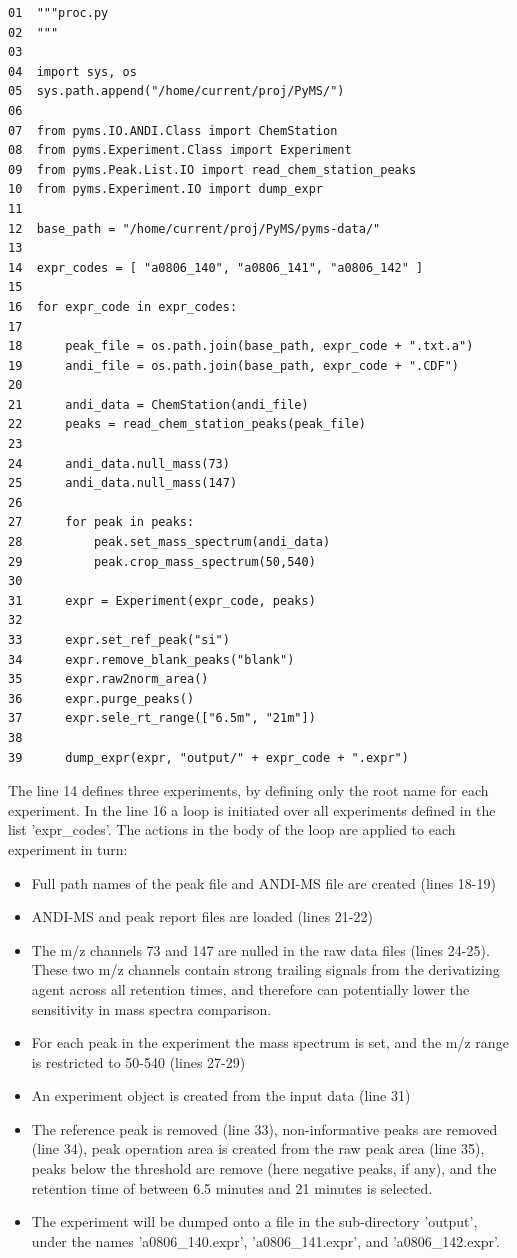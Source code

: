 \begin{verbatim}
01  """proc.py
02  """
03  
04  import sys, os
05  sys.path.append("/home/current/proj/PyMS/")
06  
07  from pyms.IO.ANDI.Class import ChemStation
08  from pyms.Experiment.Class import Experiment
09  from pyms.Peak.List.IO import read_chem_station_peaks
10  from pyms.Experiment.IO import dump_expr
11  
12  base_path = "/home/current/proj/PyMS/pyms-data/"
13  
14  expr_codes = [ "a0806_140", "a0806_141", "a0806_142" ]
15  
16  for expr_code in expr_codes:
17  
18      peak_file = os.path.join(base_path, expr_code + ".txt.a")
19      andi_file = os.path.join(base_path, expr_code + ".CDF")
20  
21      andi_data = ChemStation(andi_file)
22      peaks = read_chem_station_peaks(peak_file)
23  
24      andi_data.null_mass(73)
25      andi_data.null_mass(147)
26  
27      for peak in peaks:
28          peak.set_mass_spectrum(andi_data)
29          peak.crop_mass_spectrum(50,540)
30  
31      expr = Experiment(expr_code, peaks)
32  
33      expr.set_ref_peak("si")
34      expr.remove_blank_peaks("blank")
35      expr.raw2norm_area()
36      expr.purge_peaks()
37      expr.sele_rt_range(["6.5m", "21m"])
38  
39      dump_expr(expr, "output/" + expr_code + ".expr")
\end{verbatim}

\noindent
The line 14 defines three experiments, by defining only the root name for
each experiment. In the line 16 a loop is initiated over all experiments
defined in the list 'expr\_codes'.  The actions in the body of the loop
are applied to each experiment in turn:

\begin{itemize}
\item Full path names of the peak file and ANDI-MS file are created (lines 18-19)
\item ANDI-MS and peak report files are loaded (lines 21-22) 
\item The m/z channels 73 and 147 are nulled in the raw data files (lines
24-25). These two m/z channels contain strong trailing signals from the
derivatizing agent across all retention times, and therefore can potentially
lower the sensitivity in mass spectra comparison.
\item For each peak in the experiment the mass spectrum is set, and the
m/z range is restricted to 50-540 (lines 27-29)
\item An experiment object is created from the input data (line 31)
\item The reference peak is removed (line 33), non-informative peaks are
removed (line 34), peak operation area is created from the raw peak area
(line 35), peaks below the threshold are remove (here negative peaks, if
any), and the retention time of between 6.5 minutes and 21 minutes is
selected.
\item The experiment will be dumped onto a file in the sub-directory
'output', under the names 'a0806\_140.expr', 'a0806\_141.expr', and
'a0806\_142.expr'.
\end{itemize}

